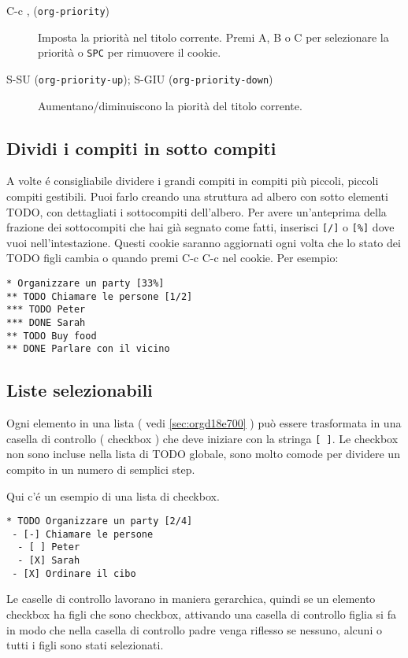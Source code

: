 \documentclass[11pt]{article}
\begin{document}
\begin{description}
\item[{C-c , (\texttt{org-priority})}] Imposta la priorità nel titolo corrente. Premi A,
B o C per selezionare la priorità o \texttt{SPC} per
rimuovere il cookie.

\item[{S-SU (\texttt{org-priority-up}); S-GIU (\texttt{org-priority-down})}] Aumentano/diminuiscono la piorità del titolo corrente.
\end{description}

\subsection[Breaking Down Tasks]{Dividi i compiti in sotto compiti}
\label{sec:org9d8d40b}
A volte é consigliabile dividere i grandi compiti in compiti più
piccoli, piccoli compiti gestibili. Puoi farlo creando una struttura
ad albero con sotto elementi TODO, con dettagliati i sottocompiti
dell'albero. Per avere un'anteprima della frazione dei sottocompiti
che hai già segnato come fatti, inserisci \texttt{[/]} o \texttt{[\%]} dove vuoi
nell'intestazione. Questi cookie saranno aggiornati ogni volta che lo
stato dei TODO figli cambia o quando premi C-c C-c nel
cookie. Per esempio:

\begin{verbatim}
* Organizzare un party [33%]
** TODO Chiamare le persone [1/2]
*** TODO Peter
*** DONE Sarah
** TODO Buy food
** DONE Parlare con il vicino
\end{verbatim}

\subsection{Liste selezionabili}
\label{sec:org62ce715}
Ogni elemento in una lista ( vedi \ref{sec:orgd18e700} ) può essere
trasformata in una casella di controllo ( checkbox ) che deve iniziare con
la stringa \texttt{[ ]}. Le checkbox non sono incluse nella lista di TODO
globale, sono molto comode per dividere un compito in un numero di
semplici step.

Qui c'é un esempio di una lista di checkbox.

\begin{verbatim}
* TODO Organizzare un party [2/4]
 - [-] Chiamare le persone
  - [ ] Peter
  - [X] Sarah
 - [X] Ordinare il cibo
\end{verbatim}

Le caselle di controllo lavorano in maniera gerarchica, quindi se un
elemento checkbox ha figli che sono checkbox, attivando una casella di
controllo figlia si fa in modo che nella casella di controllo padre
venga riflesso se nessuno, alcuni o tutti i figli sono stati selezionati.
\end{document}
